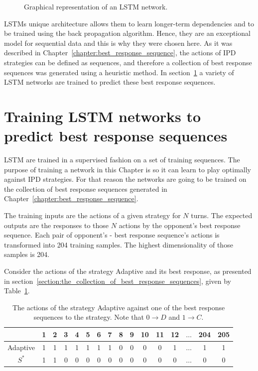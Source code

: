 \begin{figure}[!htbp]
    \centering
    
    \caption{Graphical representation of an LSTM network.}\label{fig:lstm}
\end{figure}

LSTMs unique architecture allows them to learn longer-term dependencies and to
be trained using the back propagation algorithm. Hence, they are an exceptional
model for sequential data and this is why they were chosen here. As it was described in
Chapter~\ref{chapter:best_response_sequence}, the actions of IPD strategies can
be defined as sequences, and therefore a collection of best response sequences was
generated using a heuristic method. In section~\ref{section:training_a_rnn} a
variety of LSTM networks are trained to predict these best response sequences.

\section{Training LSTM networks to predict best response sequences}\label{section:training_a_rnn}

LSTM are trained in a supervised fashion on a set of training sequences. The
purpose of training a network in this Chapter is so it can learn to play
optimally against IPD strategies. For that reason the networks are going to be
trained on the collection of best response sequences generated in
Chapter~\ref{chapter:best_response_sequence}.

The training inputs are the actions of a given strategy for \(N\) turns. The
expected outputs are the responses to those \(N\) actions by the opponent's best
response sequence. Each pair of opponent's - best response sequence's actions
is transformed into 204
training samples. The highest dimensionality of those samples is 204.

Consider the actions of the strategy Adaptive and its best response, as
presented in section~\ref{section:the_collection_of_best_response_sequences},
given by Table~\ref{table:adaptive_vs_best_response_binary_lstm}.

\begin{table}[htbp]
    \centering
    \begin{tabular}{cccccccccccccccc}
        & \textbf{1} & \textbf{2} & \textbf{3} & \textbf{4}  & \textbf{5} & \textbf{6} & \textbf{7} & \textbf{8} & \textbf{9} & \textbf{10} & \textbf{11} &  \textbf{12} & \(\dots\)  & \textbf{204} &  \textbf{205} \\ 
        \midrule
        Adaptive & 1 & 1 & 1 & 1 & 1 & 1 & 1 & 0 & 0 & 0 & 0& 1& \(\dots\) & 1 & 1 \\
        \(S^*\) & 1 & 1 & 0 & 0 & 0 & 0 & 0 & 0 & 0 & 0 & 0 & 0& \(\dots\) & 0 & 0 \\ \bottomrule
    \end{tabular}
    \caption{The actions of the strategy Adaptive against one of the best response sequences
    to the strategy. Note that \(0 \to D\) and \(1 \to C\).}\label{table:adaptive_vs_best_response_binary_lstm}
\end{table}

